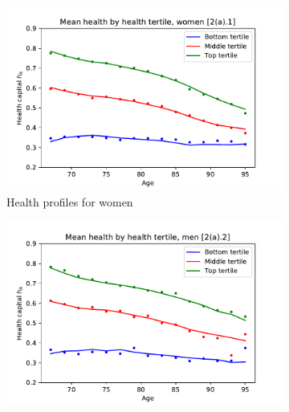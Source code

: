 \documentclass[12pt,pdftex,letterpaper]{article}
\begin{document}


\clearpage







\clearpage


\begin{figure}[h!]
    \centering
    \begin{subfigure}[b]{0.49\textwidth}
        \centering
        \includegraphics[width=\textwidth]{../Figures/HealthByHealthAgeWomenNoInvst.pdf}
        \caption{Health profiles for women}
    \end{subfigure}
    \begin{subfigure}[b]{0.49\textwidth}
        \centering
        \includegraphics[width=\textwidth]{../Figures/HealthByHealthAgeMenNoInvst.pdf}

\end{subfigure}
\end{figure}
\end{document}
